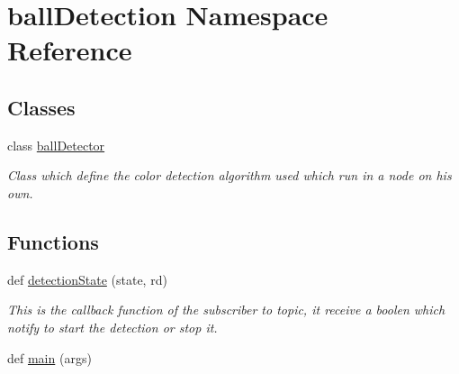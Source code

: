 \hypertarget{namespaceballDetection}{}\section{ball\+Detection Namespace Reference}
\label{namespaceballDetection}
\subsection*{Classes}
\begin{DoxyCompactItemize}
\item 
class \hyperlink{classballDetection_1_1ballDetector}{ball\+Detector}
\begin{DoxyCompactList}\small\item\em Class which define the color detection algorithm used which run in a node on his own. \end{DoxyCompactList}\end{DoxyCompactItemize}
\subsection*{Functions}
\begin{DoxyCompactItemize}
\item 
def \hyperlink{namespaceballDetection_af90d57b7d5fbbaa648ba3ba524d541dd}{detection\+State} (state, rd)
\begin{DoxyCompactList}\small\item\em This is the callback function of the subscriber to  topic, it receive a boolen which notify to start the detection or stop it. \end{DoxyCompactList}\item 
def \hyperlink{namespaceballDetection_a8193b8aef394c20f60fadbaeacdafdc0}{main} (args)
\end{DoxyCompactItemize}
